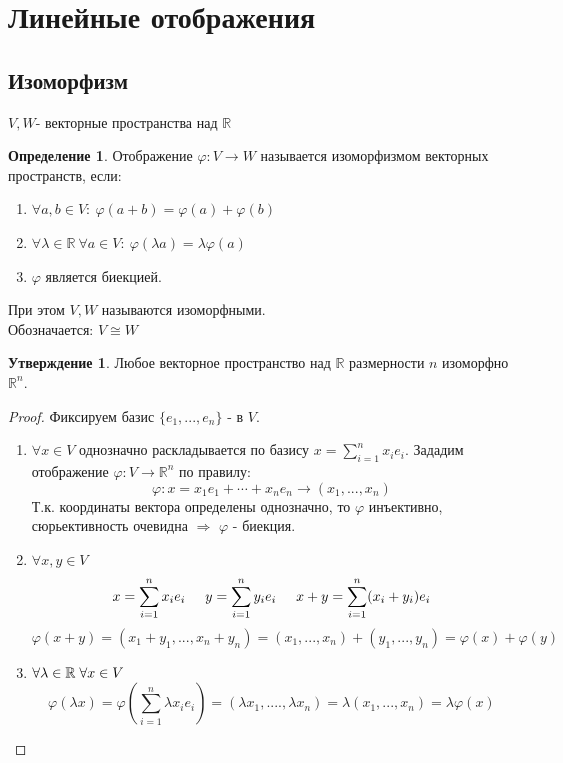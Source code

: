 \documentclass[a4paper, 12pt]{article}
\newcommand{\R}{\mathbb R}
\renewcommand{\phi}{\varphi}
\newcommand\tab[1][.5cm]{\hspace*{#1}}
\theoremstyle{definition}
\newtheorem*{definition}{Определение}
\newtheorem*{subtheorem}{Утверждение}
\begin{document}
  \newpage
    
  \section{Линейные отображения}
  \subsection{Изоморфизм}
  
  $V, W$- векторные пространства над $\R$ 
  \begin{definition}
    Отображение $\phi: V \to W$ называется изоморфизмом векторных пространств, если:
    \begin{enumerate}
      \item $\forall a, b \in V: \ \phi(a+b) = \phi(a) + \phi(b)$
      \item $\forall \lambda \in \R \ \forall a \in V: \ \phi(\lambda a) = \lambda \phi(a)$
      \item $\phi$ является биекцией. 
    \end{enumerate}
    При этом $V, W$ называются изоморфными.\\ 
    Обозначается: $V \cong W$ 
  \end{definition} 
  \begin{subtheorem}
    Любое векторное  пространство над $\R$ размерности $n$ изоморфно $\R^n$. 
  \end{subtheorem} 
  \begin{proof}
    Фиксируем базис $\{e_1,...,e_n\}$ - в $V$.
    \begin{enumerate}
      \item $\forall x \in V$ однозначно раскладывается по базису $x = \sum \limits_{i=1}^{n} x_ie_i$. 
    Зададим отображение  $\phi: V \to \R^n$ по правилу:
    $$\phi: x = x_1e_1 + \cdots + x_ne_n \to (x_1,...,x_n)$$
    Т.к. координаты вектора определены однозначно, то $\phi$ инъективно, сюрьективность очевидна $\Longrightarrow $ $\phi$ - биекция.
    \item $\forall x,y \in V$
    $$x = \sum \limits_{i=1}^{n} x_ie_i \tab[0.5cm] y = \sum \limits_{i=1}^{n} y_ie_i \tab[0.5cm]
    x + y = \sum \limits_{i=1}^{n} (x_i + y_i)e_i$$ 
    $$\phi(x+y) = (x_1 + y_1,...,x_n+y_n) = (x_1,...,x_n) + (y_1,...,y_n) = \phi(x) + \phi(y)$$ 
    \item $\forall \lambda \in \R \tab[0.1cm] \forall x \in V$
    $$\phi(\lambda x) = \phi(\sum \limits_{i=1}^{n} \lambda x_ie_i) = (\lambda x_1,....,\lambda x_n) = \lambda (x_1,...,x_n) = \lambda \phi(x)$$  
    \end{enumerate}
  \end{proof} 
\end{document}
